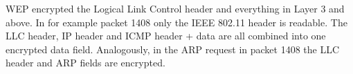 WEP encrypted the Logical Link Control header and everything in Layer 3 and above. In for example packet 1408 only the IEEE 802.11 header is readable. The LLC header, IP header and ICMP header + data are all combined into one encrypted data field. Analogously, in the ARP request in packet 1408 the LLC header and ARP fields are encrypted.

